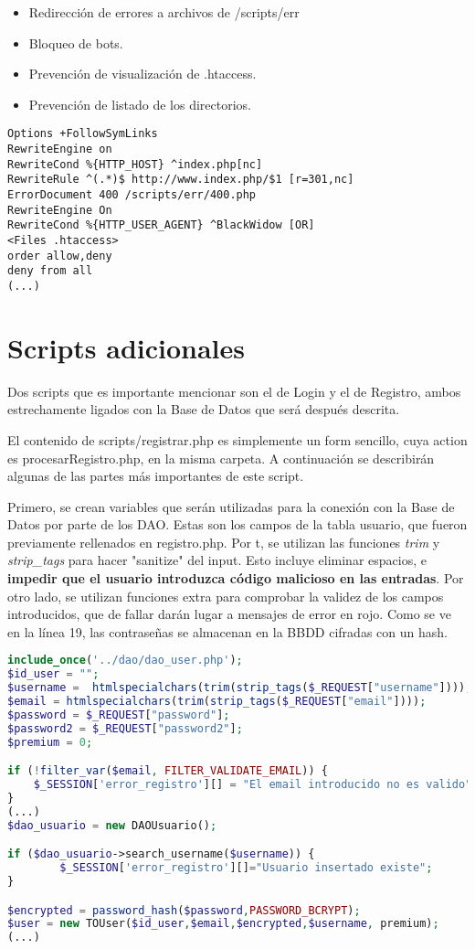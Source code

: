 \documentclass[12pt]{report}
\begin{document}
\begin{itemize}
    \item Redirección de errores a archivos de /scripts/err
    \item Bloqueo de bots.
    \item Prevención de visualización de .htaccess.
    \item Prevención de listado de los directorios.
\end{itemize}
\newline


\begin{lstlisting}
Options +FollowSymLinks
RewriteEngine on
RewriteCond %{HTTP_HOST} ^index.php[nc]
RewriteRule ^(.*)$ http://www.index.php/$1 [r=301,nc]
ErrorDocument 400 /scripts/err/400.php
RewriteEngine On 
RewriteCond %{HTTP_USER_AGENT} ^BlackWidow [OR]
<Files .htaccess>
order allow,deny
deny from all
(...)
\end{lstlisting}

 \newpage
\section{Scripts adicionales}
Dos scripts que es importante mencionar son el de Login y el de Registro, ambos estrechamente ligados con la Base de Datos que será después descrita. 

El contenido de scripts/registrar.php es simplemente un form sencillo, cuya action es procesarRegistro.php, en la misma carpeta. A continuación se describirán algunas de las partes más importantes de este script.

Primero, se crean variables que serán utilizadas para la conexión con la Base de Datos por parte de los DAO. Estas son los campos de la tabla usuario, que fueron previamente rellenados en registro.php. Por t, se utilizan las funciones \textit{trim} y \textit{strip\_tags} para hacer "sanitize" del input. Esto incluye eliminar espacios, e \textbf{impedir que el usuario introduzca código malicioso en las entradas}. Por otro lado, se utilizan funciones extra para comprobar la validez de los campos introducidos, que de fallar darán lugar a mensajes de error en rojo. Como se ve en la línea 19, las contraseñas se almacenan en la BBDD cifradas con un hash.
\newline
\begin{lstlisting}[language=PHP]
include_once('../dao/dao_user.php');
$id_user = "";
$username =  htmlspecialchars(trim(strip_tags($_REQUEST["username"])));
$email = htmlspecialchars(trim(strip_tags($_REQUEST["email"])));
$password = $_REQUEST["password"];
$password2 = $_REQUEST["password2"];
$premium = 0;

if (!filter_var($email, FILTER_VALIDATE_EMAIL)) {  
    $_SESSION['error_registro'][] = "El email introducido no es valido";
}
(...)
$dao_usuario = new DAOUsuario();

if ($dao_usuario->search_username($username)) { 
        $_SESSION['error_registro'][]="Usuario insertado existe";
}

$encrypted = password_hash($password,PASSWORD_BCRYPT); 
$user = new TOUser($id_user,$email,$encrypted,$username, premium);
(...)
\end{lstlisting}
\end{document}
